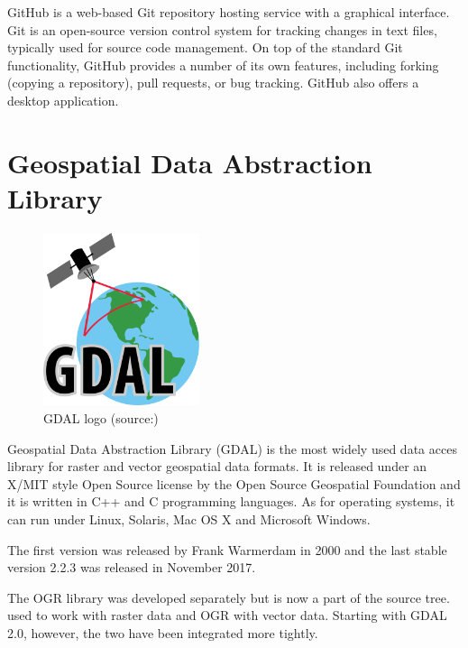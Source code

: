   GitHub is a web-based Git repository hosting service with a
  graphical interface. Git is an open-source version control system
  for tracking changes in text files, typically used for source code
  management.\cite{git} On top of the standard Git functionality,
  GitHub provides a number of its own features, including forking
  (copying a repository), pull requests, or bug tracking. GitHub also
  offers a desktop application.

\section{Geospatial Data Abstraction Library} \label{gdal}

\begin{figure}[H] \centering
      \includegraphics[width=130pt]{./pictures/gdal.png}
      \caption[GDAL logo]{GDAL logo (source:{\cite{gdal}})}
      \label{fig:GDAL}
  \end{figure}

  Geospatial Data Abstraction Library (GDAL) is the most widely
  used data acces library for raster and vector geospatial
  data formats. It is released under an X/MIT style Open Source
  license by the Open Source Geospatial Foundation and it is written
  in C++ and C programming languages. As for operating systems, it can
  run under Linux, Solaris, Mac OS X and Microsoft Windows.\cite{gdal}

  The first version was released by Frank Warmerdam in 2000 and the
  last stable version 2.2.3 was released in November
  2017.\cite{gdalrelease}


  The OGR library was developed separately but is now a part of
  the  source tree.  used to work with raster data
  and OGR with vector data. Starting with GDAL 2.0, however, the two
  have been integrated more tightly.

